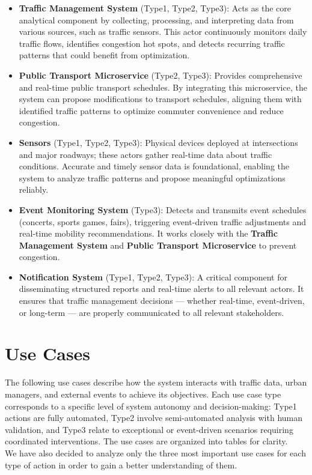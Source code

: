 \documentclass[a4paper,12pt]{article}
\begin{document}
\begin{itemize}
    \item \textbf{Traffic Management System} (Type1, Type2, Type3): Acts as the core analytical component by collecting, processing, and interpreting data from various sources, such as traffic sensors. This actor continuously monitors daily traffic flows, identifies congestion hot spots, and detects recurring traffic patterns that could benefit from optimization.
    \item \textbf{Public Transport Microservice} (Type2, Type3): Provides comprehensive and real-time public transport schedules. By integrating this microservice, the system can propose modifications to transport schedules, aligning them with identified traffic patterns to optimize commuter convenience and reduce congestion.
    \item \textbf{Sensors} (Type1, Type2, Type3): Physical devices deployed at intersections and major roadways; these actors gather real-time data about traffic conditions. Accurate and timely sensor data is foundational, enabling the system to analyze traffic patterns and propose meaningful optimizations reliably.
    \item \textbf{Event Monitoring System} (Type3): Detects and transmits event schedules (concerts, sports games, fairs), triggering event-driven traffic adjustments and real-time mobility recommendations. It works closely with the \textbf{Traffic Management System} and \textbf{Public Transport Microservice} to prevent congestion.
    \item \textbf{Notification System} (Type1, Type2, Type3): A critical component for disseminating structured reports and real-time alerts to all relevant actors. It ensures that traffic management decisions — whether real-time, event-driven, or long-term — are properly communicated to all relevant stakeholders.
\end{itemize}

\newpage

\section{Use Cases}
The following use cases describe how the system interacts with traffic data, urban managers, and external events to achieve its objectives. Each use case type corresponds to a specific level of system autonomy and decision-making: Type1 actions are fully automated, Type2 involve semi-automated analysis with human validation, and Type3 relate to exceptional or event-driven scenarios requiring coordinated interventions. The use cases are organized into tables for clarity.
\\ We have also decided to analyze only the three most important use cases for each type of action in order to gain a better understanding of them.
\end{document}
